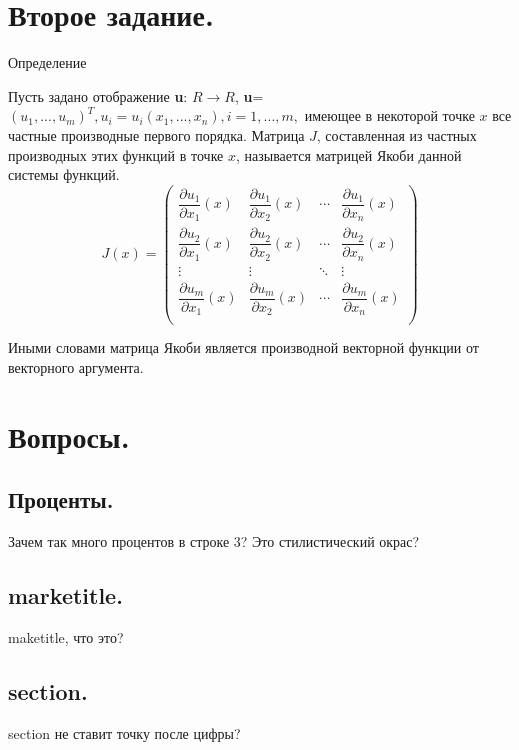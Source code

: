 \documentclass[a4paper,12pt]{article} %
\begin{document}
	\section{Второе задание.}
	Определение
	
	Пусть задано отображение 
	\textbf{u}: $R \longrightarrow R$,
	\textbf{u}=$\left(u_1,...,u_m\right)^T, u_i=u_i\left(x_1,...,x_n\right),i=1,...,m,$
	имеющее в некоторой точке $x$ все частные производные первого порядка. Матрица $J$, составленная из частных производных этих функций в точке $x$, называется матрицей Якоби данной системы функций.
	$$J\left(x \right)=\begin{pmatrix} 
		\dfrac{\partial u_1}{\partial x_1} \left(x\right) & \dfrac{\partial u_1}{\partial x_2} \left(x\right) & \cdots & \dfrac{\partial u_1}{\partial x_n} \left(x\right)\\
		\dfrac{\partial u_2}{\partial x_1} \left(x\right) & \dfrac{\partial u_2}{\partial x_2} \left(x\right) & \cdots & \dfrac{\partial u_2}{\partial x_n} \left(x\right)\\
		\vdots & \vdots & \ddots & \vdots \\
		\dfrac{\partial u_m}{\partial x_1} \left(x\right) & \dfrac{\partial u_m}{\partial x_2} \left(x\right) & \cdots & \dfrac{\partial u_m}{\partial x_n} \left(x\right)\\
	\end{pmatrix}		
	$$
	
	
	Иными словами матрица Якоби является производной векторной функции от векторного аргумента.
	
	
	
	\section{Вопросы.}
	
	\subsection{Проценты.}
	Зачем так много процентов в строке 3? Это стилистический окрас?
	
	\subsection{marketitle.}
	maketitle, что это?
	
	\subsection{section.}
	section не ставит точку после цифры?
	
\end{document}
